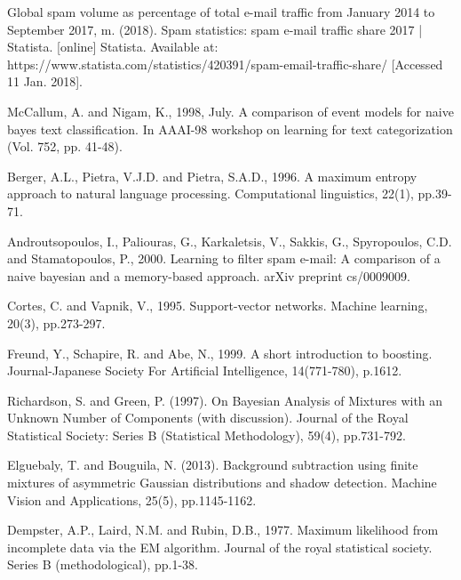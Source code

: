\documentclass[conference]{IEEEtran}
\begin{document}
\begin{thebibliography}{[MT1]}
 Global spam volume as percentage of total e-mail traffic from January 2014 to September 2017, m. (2018). Spam statistics: spam e-mail traffic share 2017 | Statista. [online] Statista. Available at: https://www.statista.com/statistics/420391/spam-email-traffic-share/ [Accessed 11 Jan. 2018].


 McCallum, A. and Nigam, K., 1998, July. A comparison of event models for naive bayes text classification. In AAAI-98 workshop on learning for text categorization (Vol. 752, pp. 41-48).

 Berger, A.L., Pietra, V.J.D. and Pietra, S.A.D., 1996. A maximum entropy approach to natural language processing. Computational linguistics, 22(1), pp.39-71.

 Androutsopoulos, I., Paliouras, G., Karkaletsis, V., Sakkis, G., Spyropoulos, C.D. and Stamatopoulos, P., 2000. Learning to filter spam e-mail: A comparison of a naive bayesian and a memory-based approach. arXiv preprint cs/0009009.

 Cortes, C. and Vapnik, V., 1995. Support-vector networks. Machine learning, 20(3), pp.273-297.

 Freund, Y., Schapire, R. and Abe, N., 1999. A short introduction to boosting. Journal-Japanese Society For Artificial Intelligence, 14(771-780), p.1612.


 Richardson, S. and Green, P. (1997). On Bayesian Analysis of Mixtures with an Unknown Number of Components (with discussion). Journal of the Royal Statistical Society: Series B (Statistical Methodology), 59(4), pp.731-792.

 Elguebaly, T. and Bouguila, N. (2013). Background subtraction using finite mixtures of asymmetric Gaussian distributions and shadow detection. Machine Vision and Applications, 25(5), pp.1145-1162.

 Dempster, A.P., Laird, N.M. and Rubin, D.B., 1977. Maximum likelihood from incomplete data via the EM algorithm. Journal of the royal statistical society. Series B (methodological), pp.1-38.


\end{thebibliography}
\end{document}
